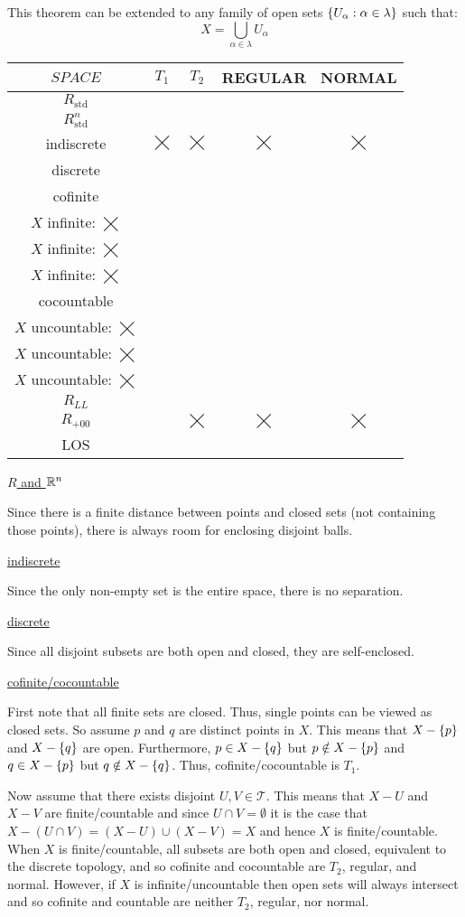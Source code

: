 \documentclass[letterpaper,12pt,fleqn]{article}
\newcommand{\T}{\mathscr{T}}
\renewcommand{\a}{\alpha}
\renewcommand{\l}{\lambda}
\renewcommand{\C}{\checkmark}
\newcommand{\X}{\(\bigtimes\)}
\newcommand{\A}{
  \begin{minipage}{1in}
    \(X\) finite: \C \\
    \(X\) infinite: \X
  \end{minipage}
}
\newcommand{\B}{
  \begin{minipage}{1.5in}
    \(X\) countable: \C \\
    \(X\) uncountable: \X
  \end{minipage}
}
\begin{document}
This theorem can be extended to any family of open sets \(\set{U_{\a}:\a\in\l}\) such that:
\[X=\bigcup_{\a\in\l}U_{\a}\]

\newpage

\begin{example}
  \setlength\extrarowheight{2ex}
  \begin{tabular}{|c|c|c|c|c|}
    \hline
    \(SPACE\) & \(T_1\) & \(T_2\) & REGULAR & NORMAL \\
    \hline
    \(R_{\text{std}}\) & \C & \C & \C & \C \\
    \hline
    \(R^n_{\text{std}}\) & \C & \C & \C & \C \\
    \hline
    indiscrete & \X & \X & \X & \X \\
    \hline
    discrete & \C & \C & \C & \C \\
    \hline
    cofinite & \C & \A & \A & \A \\
    \hline
    cocountable & \C & \B & \B & \B \\
    \hline
    \(R_{LL}\) & \C & \C & \C & \C \\
    \hline
    \(R_{+00}\) & \C & \X & \X & \X \\
    \hline
    LOS & \C & \C & \C & \C \\
    \hline
  \end{tabular}

  \bigskip

  \underline{\(R\) and \(\mathbb{R}^n\)}

  Since there is a finite distance between points and closed sets (not containing those points), there is always room
  for enclosing disjoint balls.

  \underline{indiscrete}

  Since the only non-empty set is the entire space, there is no separation.

  \underline{discrete}

  Since all disjoint subsets are both open and closed, they are self-enclosed.

  \underline{cofinite/cocountable}

  First note that all finite sets are closed.  Thus, single points can be viewed as closed sets. So assume \(p\)
  and \(q\) are distinct points in \(X\).  This means that \(X-\{p\}\) and \(X-\{q\}\) are open.  Furthermore,
  \(p\in X-\{q\}\) but \(p\notin X-\{p\}\) and \(q\in X-\{p\}\) but \(q\notin X-\{q\}\).  Thus,
  cofinite/cocountable is \(T_1\).

  Now assume that there exists disjoint \(U,V\in\T\).  This means that \(X-U\) and \(X-V\) are finite/countable and
  since \(U\cap V=\emptyset\) it is the case that \(X-(U\cap V)=(X-U)\cup(X-V)=X\) and hence \(X\) is
  finite/countable.  When \(X\) is finite/countable, all subsets are both open and closed, equivalent to the
  discrete topology, and so cofinite and cocountable are \(T_2\), regular, and normal.  However, if \(X\) is
  infinite/uncountable then open sets will always intersect and so cofinite and countable are neither \(T_2\),
  regular, nor normal.


\end{example}
\end{document}
